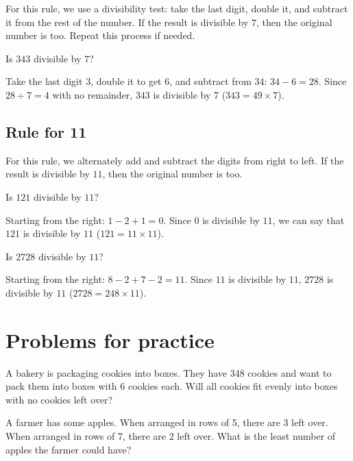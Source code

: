 \documentclass{article}
\theoremstyle{mytheoremstyle}
\theoremstyle{mytheoremstyle}
\theoremstyle{myproblemstyle}
\theoremstyle{myproblemstyle}
\begin{document}
        For this rule, we use a divisibility test: take the last digit, double it, and subtract it from the rest of the number. If the result is divisible by $7$, then the original number is too. Repeat this process if needed.

        \begin{example}
            Is $343$ divisible by $7$?
        \end{example}

        Take the last digit $3$, double it to get $6$, and subtract from $34$: $34 - 6 = 28$. Since $28 \div 7 = 4$ with no remainder, $343$ is divisible by $7$ ($343 = 49 \times 7$).

        \subsection{Rule for 11}

        For this rule, we alternately add and subtract the digits from right to left. If the result is divisible by $11$, then the original number is too.

        \begin{example}
            Is $121$ divisible by $11$?
        \end{example}

        Starting from the right: $1 - 2 + 1 = 0$. Since $0$ is divisible by $11$, we can say that $121$ is divisible by $11$ ($121 = 11 \times 11$).

        \begin{example}
            Is $2728$ divisible by $11$?
        \end{example}

        Starting from the right: $8 - 2 + 7 - 2 = 11$. Since $11$ is divisible by $11$, $2728$ is divisible by $11$ ($2728 = 248 \times 11$).  
        \section{Problems for practice}

        \begin{problem}
            A bakery is packaging cookies into boxes. They have 348 cookies and want to pack them into boxes with 6 cookies each. Will all cookies fit evenly into boxes with no cookies left over?
        \end{problem}

        \begin{problem}
            A farmer has some apples. When arranged in rows of 5, there are 3 left over. When arranged in rows of 7, there are 2 left over. What is the least number of apples the farmer could have?
        \end{problem}
\end{document}
